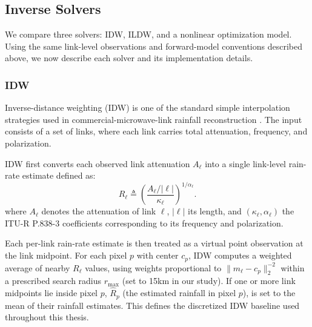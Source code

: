 \documentclass[11pt]{article}
\begin{document}
\subsection{Inverse Solvers}
We compare three solvers: IDW, ILDW, and a nonlinear optimization model. Using the same link-level observations and forward-model conventions described above, we now describe each solver and its implementation details.
\subsubsection{IDW}
Inverse-distance weighting (IDW) is one of the standard simple interpolation strategies used in commercial-microwave-link rainfall reconstruction \citep{chwala2019cml}. The input consists of a set of links, where each link carries total attenuation, frequency, and polarization.

IDW first converts each observed link attenuation $A_\ell$ into a single link-level rain-rate estimate defined as:
\[
R_\ell \triangleq \left(\frac{A_\ell/|\ell|}{\kappa_\ell}\right)^{1/\alpha_\ell}.
\]
where $A_\ell$ denotes the attenuation of link $\ell$, $|\ell|$ its length, and $(\kappa_\ell,\alpha_\ell)$ the ITU-R P.838-3 coefficients corresponding to its frequency and polarization.

Each per-link rain-rate estimate is then treated as a virtual point observation at the link midpoint. For each pixel $p$ with center $c_p$, IDW computes a weighted average of nearby $R_\ell$ values, using weights proportional to $\|m_\ell-c_p\|_2^{-2}$ within a prescribed search radius $r_{\max}$ (set to 15km in our study). If one or more link midpoints lie inside pixel $p$, $\hat R_p$ (the estimated rainfall in pixel $p$), is set to the mean of their rainfall estimates. This defines the discretized IDW baseline used throughout this thesis.
\end{document}
